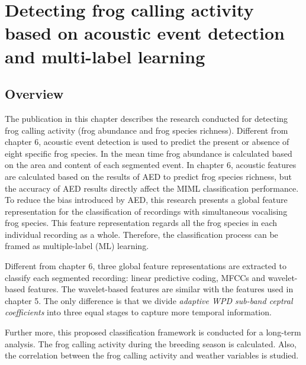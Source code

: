 
\chapter{Detecting frog calling activity based on acoustic event detection and multi-label learning}
\label{cha:cha7ML}


\section{Overview}
\label{sect:introduction}

The publication in this chapter describes the research conducted for detecting frog calling activity (frog abundance and frog species richness). Different from chapter 6, acoustic event detection is used to predict the present or absence of eight specific frog species. In the mean time frog abundance is calculated based on the area and content of each segmented event.
In chapter 6, acoustic features are calculated based on the results of AED to predict frog species richness, but the accuracy of AED results directly affect the MIML classification performance.
To reduce the bias introduced by AED, this research presents a global feature representation for the classification of recordings with simultaneous vocalising frog species. This feature representation regards all the frog species in each individual recording as a whole. Therefore, the classification process can be framed as multiple-label (ML) learning.  



Different from chapter 6, three global feature representations are extracted to classify each segmented recording: linear predictive coding, MFCCs and wavelet-based features. The wavelet-based features are similar with the features used in chapter 5. The only difference is that we divide \textit{adaptive WPD sub-band ceptral coefficients} into three equal stages to capture more temporal information.


 
Further more, this proposed classification framework is conducted for a long-term analysis. The frog calling activity during the breeding season is calculated. Also, the correlation between the frog calling activity and weather variables is studied. 

  



